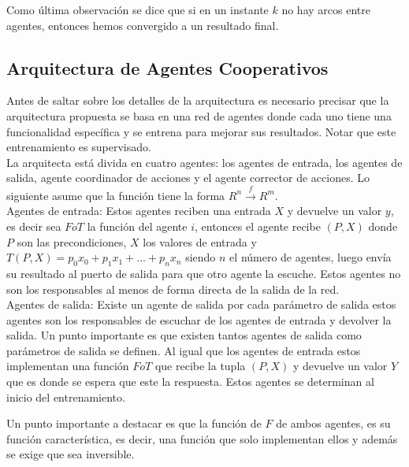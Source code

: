         Como última observación se dice que si en un instante $k$ no hay arcos entre agentes, entonces hemos convergido a un resultado final.

    \subsection*{Arquitectura de Agentes Cooperativos}

        Antes de saltar sobre los detalles de la arquitectura es necesario precisar que la arquitectura propuesta se basa en una red de agentes donde cada uno tiene una funcionalidad específica y se entrena para mejorar sus resultados. Notar que este entrenamiento es supervisado. \\

        La arquitecta está divida en cuatro agentes: los agentes de entrada, los agentes de salida, agente coordinador de acciones y el agente corrector de acciones. Lo siguiente asume que la función tiene la forma $R^n \xrightarrow{f} R^m$. \\

        Agentes de entrada: Estos agentes reciben una entrada $X$ y devuelve un valor $y$, es decir sea $FoT$ la función del agente $i$, entonces el agente recibe $(P,X)$ donde $P$ son las precondiciones, $X$ los valores de entrada y
        $T(P,X)=p_0x_0 + p_1x_1 +...+p_nx_n$ siendo $n$ el número de agentes, luego envía su resultado al puerto de salida para que otro agente la escuche. Estos agentes no son los responsables al menos de forma directa de la salida de la red.\\

        Agentes de salida: Existe un agente de salida por cada parámetro de salida estos agentes son los responsables de escuchar de los agentes de entrada y devolver la salida.
        Un punto importante es que existen tantos agentes de salida como parámetros de salida se definen. Al igual que los agentes de entrada estos implementan una función $FoT$ 
        que recibe la tupla $(P,X)$ y devuelve un valor $Y$ que es donde se espera que este la respuesta. Estos agentes se determinan al inicio del entrenamiento.

        Un punto importante a destacar es que la función de $F$ de ambos agentes, es su función característica, es decir, una función que solo implementan ellos y además se exige que sea inversible.

